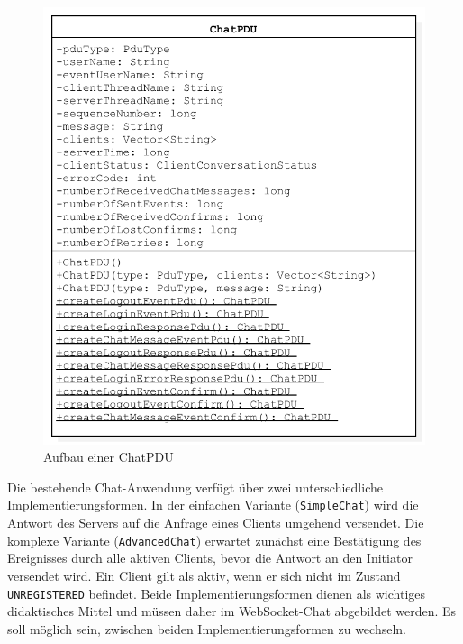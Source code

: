\documentclass[11pt,a4paper,titlepage]{scrartcl}
\numberwithin{equation}{section}
\begin{document}
\begin{figure}[ht] 
	\begin{center}
		\includegraphics[scale=0.7]{img/ChatPDU.pdf}
		\caption{Aufbau einer ChatPDU}
		\label{fig:chatPDU}
	\end{center}
\end{figure}

\noindent Die bestehende Chat-Anwendung verfügt über zwei unterschiedliche Implementierungsformen. In der einfachen Variante (\texttt{SimpleChat}) wird die Antwort des Servers auf die Anfrage eines Clients umgehend versendet. Die komplexe Variante (\texttt{AdvancedChat}) erwartet zunächst eine Bestätigung des Ereignisses durch alle aktiven Clients, bevor die Antwort an den Initiator versendet wird. Ein Client gilt als aktiv, wenn er sich nicht im Zustand \texttt{UNREGISTERED} befindet. Beide Implementierungsformen dienen als wichtiges didaktisches Mittel und müssen daher im WebSocket-Chat abgebildet werden. Es soll möglich sein, zwischen beiden Implementierungsformen zu wechseln.
\end{document}
